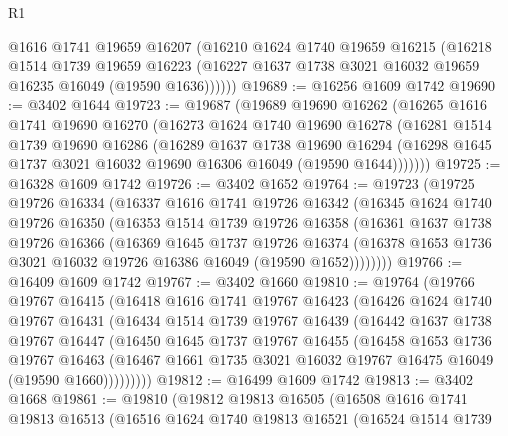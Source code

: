 \begin{lexlean}{R1}
\begin{coremodule}
        @1616
        @1741
        @19659
        @16207
        (@16210
          @1624
          @1740
          @19659
          @16215
          (@16218
            @1514
            @1739
            @19659
            @16223
            (@16227 @1637 @1738 @3021 @16032 @19659 @16235 @16049 (@19590 @1636))))))
@19689 := @16256 @1609 @1742
@19690 := @3402 @1644
@19723 := @19687
    (@19689
      @19690
      @16262
      (@16265
        @1616
        @1741
        @19690
        @16270
        (@16273
          @1624
          @1740
          @19690
          @16278
          (@16281
            @1514
            @1739
            @19690
            @16286
            (@16289
              @1637
              @1738
              @19690
              @16294
              (@16298 @1645 @1737 @3021 @16032 @19690 @16306 @16049 (@19590 @1644)))))))
@19725 := @16328 @1609 @1742
@19726 := @3402 @1652
@19764 := @19723
    (@19725
      @19726
      @16334
      (@16337
        @1616
        @1741
        @19726
        @16342
        (@16345
          @1624
          @1740
          @19726
          @16350
          (@16353
            @1514
            @1739
            @19726
            @16358
            (@16361
              @1637
              @1738
              @19726
              @16366
              (@16369
                @1645
                @1737
                @19726
                @16374
                (@16378 @1653 @1736 @3021 @16032 @19726 @16386 @16049 (@19590 @1652))))))))
@19766 := @16409 @1609 @1742
@19767 := @3402 @1660
@19810 := @19764
    (@19766
      @19767
      @16415
      (@16418
        @1616
        @1741
        @19767
        @16423
        (@16426
          @1624
          @1740
          @19767
          @16431
          (@16434
            @1514
            @1739
            @19767
            @16439
            (@16442
              @1637
              @1738
              @19767
              @16447
              (@16450
                @1645
                @1737
                @19767
                @16455
                (@16458
                  @1653
                  @1736
                  @19767
                  @16463
                  (@16467 @1661 @1735 @3021 @16032 @19767 @16475 @16049 (@19590 @1660)))))))))
@19812 := @16499 @1609 @1742
@19813 := @3402 @1668
@19861 := @19810
    (@19812
      @19813
      @16505
      (@16508
        @1616
        @1741
        @19813
        @16513
        (@16516
          @1624
          @1740
          @19813
          @16521
          (@16524
            @1514
            @1739

\end{coremodule}
\end{lexlean}
